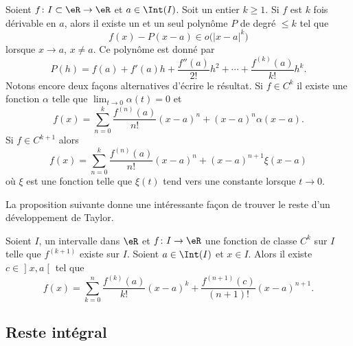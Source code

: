 \begin{proposition}     \label{PropDevTaylorPol}
	Soient \( f\colon I\subset\eR\to \eR\) et \( a\in\Int(I)\). Soit un entier \( k\geq 1\). Si \( f\) est \( k\) fois dérivable en \( a\), alors il existe un et un seul polynôme \( P\) de degré \( \leq k\) tel que
	\begin{equation}
		f(x)-P(x-a)\in o\big( | x-a |^k \big)
	\end{equation}
	lorsque \( x\to a\), \( x\neq a\). Ce polynôme  est donné par
	\begin{equation}
		P(h)=f(a)+f'(a)h+\frac{ f''(a) }{ 2! }h^2+\cdots+\frac{ f^{(k)}(a) }{ k! }h^k.
	\end{equation}
	Notons encore deux façons alternatives d'écrire le résultat. Si \( f\in C^k\) il existe une fonction \( \alpha\) telle que \( \lim_{t\to 0} \alpha(t)=0\) et
	\begin{equation}
		f(x)=\sum_{n=0}^k\frac{ f^{(n)}(a) }{ n! }(x-a)^n+(x-a)^n\alpha(x-a).
	\end{equation}
	Si \( f\in C^{k+1}\) alors
	\begin{equation}        \label{EquQtpoN}
		f(x)=\sum_{n=0}^k\frac{ f^{(n)}(a) }{ n! }(x-a)^n+(x-a)^{n+1}\xi(x-a)
	\end{equation}
	où \( \xi\) est une fonction telle que \( \xi(t)\) tend vers une constante lorsque \( t\to 0\).
\end{proposition}

La proposition suivante donne une intéressante façon de trouver le reste d'un développement de Taylor.
\begin{proposition}     \label{PropResteTaylorc}
	Soient \( I\), un intervalle dans \( \eR\) et \( f\colon I\to \eR\) une fonction de classe \( C^k\) sur \( I\) telle que \( f^{(k+1)}\) existe sur \( I\). Soient \( a\in\Int(I)\) et \( x\in I\). Alors il existe \( c\in\mathopen] x , a \mathclose[\) tel que
	\begin{equation}
		f(x)=\sum_{k=0}^n\frac{ f^{(k)}(a) }{ k! }(x-a)^k+\frac{ f^{(n+1)}(c) }{ (n+1)! }(x-a)^{n+1}.
	\end{equation}
\end{proposition}

\subsection{Reste intégral}

